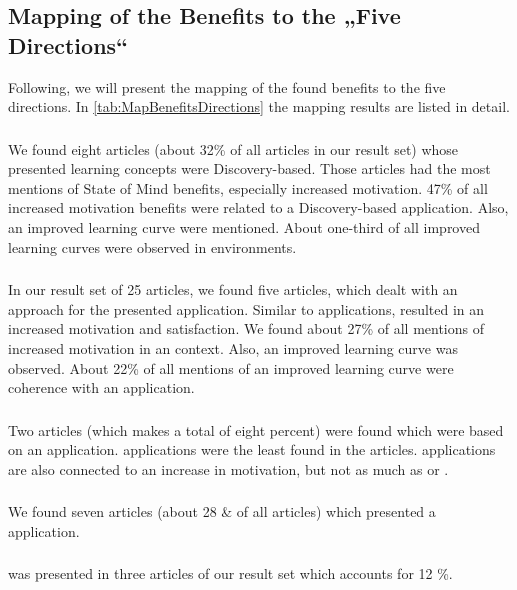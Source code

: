 \subsection{Mapping of the Benefits to the „Five Directions“}
\label{subsec:Mapping}
Following, we will present the mapping of the found benefits to the five directions. In \ref{tab:MapBenefitsDirections} the mapping results are listed in detail. 

\subsubsection{\DBLns}
We found eight articles (about 32\% of all articles in our result set) whose presented learning concepts were Discovery-based. Those articles had the most mentions of State of Mind benefits, especially increased motivation. 47\% of all increased motivation benefits were related to a Discovery-based \AR application. Also, an improved learning curve were mentioned. About one-third of all improved learning curves were observed in \DBL environments.

\subsubsection{\OMns}
In our result set of 25 articles, we found five articles, which dealt with an \OM approach for the presented \AR application. Similar to \DBL applications, \OM resulted in an increased motivation and satisfaction. We found about 27\% of all mentions of increased motivation in an \OM context. Also, an improved learning curve was observed. About 22\% of all mentions of an improved learning curve were coherence with an \OM application.

\subsubsection{\ARBns}
Two articles (which makes a total of eight percent) were found which were based on an \ARB application. \ARB applications were the least found in the articles. \ARB applications are also connected to an increase in motivation, but not as much as \DBL or \OM.

\subsubsection{\STns}
We found seven articles (about 28 \& of all articles) which presented a \ST \AR application.

\subsubsection{\ARGns}
\ARG was presented in three articles of our result set which accounts for 12 \%. 

